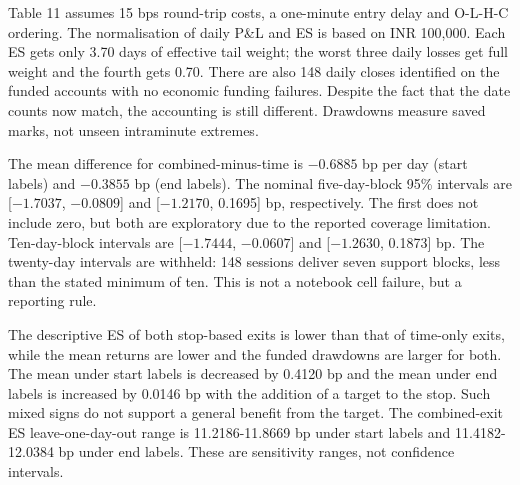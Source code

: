 \documentclass[11pt,a4paper]{article}
\begin{document}
Table 11 assumes 15 bps round-trip costs, a one-minute entry delay and O-L-H-C ordering. The normalisation of daily P\&L and ES is based on INR 100,000. Each ES gets only 3.70 days of effective tail weight; the worst three daily losses get full weight and the fourth gets 0.70. There are also 148 daily closes identified on the funded accounts with no economic funding failures. Despite the fact that the date counts now match, the accounting is still different. Drawdowns measure saved marks, not unseen intraminute extremes.

The mean difference for combined-minus-time is \(-0.6885\) bp per day (start labels) and \(-0.3855\) bp (end labels). The nominal five-day-block 95\% intervals are [\(-1.7037\), \(-0.0809\)] and [\(-1.2170\), 0.1695] bp, respectively. The first does not include zero, but both are exploratory due to the reported coverage limitation. Ten-day-block intervals are [\(-1.7444\), \(-0.0607\)] and [\(-1.2630\), 0.1873] bp. The twenty-day intervals are withheld: 148 sessions deliver seven support blocks, less than the stated minimum of ten. This is not a notebook cell failure, but a reporting rule.

The descriptive ES of both stop-based exits is lower than that of time-only exits, while the mean returns are lower and the funded drawdowns are larger for both. The mean under start labels is decreased by 0.4120 bp and the mean under end labels is increased by 0.0146 bp with the addition of a target to the stop. Such mixed signs do not support a general benefit from the target. The combined-exit ES leave-one-day-out range is 11.2186-11.8669 bp under start labels and 11.4182-12.0384 bp under end labels. These are sensitivity ranges, not confidence intervals.
\end{document}
